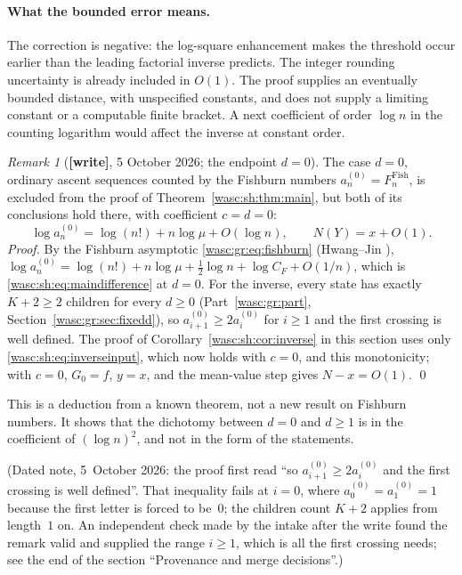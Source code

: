 \documentclass[11pt,a4paper]{article}
\theoremstyle{remark}\newtheorem{remark}[theorem]{Remark}
\numberwithin{equation}{section}
\newcommand{\wtag}{\textup{\textbf{[write]}}}
\begin{document}
\paragraph{What the bounded error means.}
The correction is negative: the log-square enhancement makes the threshold occur earlier than the leading factorial inverse predicts. The integer rounding uncertainty is already included in $O(1)$. The proof supplies an eventually bounded distance, with unspecified constants, and does not supply a limiting constant or a computable finite bracket. A next coefficient of order $\log n$ in the counting logarithm would affect the inverse at constant order.
\begin{remark}[\wtag, 5 October 2026; the endpoint $d=0$]\label{wasc:sh:rem:dzero}
The case $d=0$, ordinary ascent sequences counted by the Fishburn numbers $a^{(0)}_n=F^{\mathrm{Fish}}_n$, is excluded from the proof of Theorem~\ref{wasc:sh:thm:main}, but both of its conclusions hold there, with coefficient $c=d=0$:
\[
\log a^{(0)}_n=\log(n!)+n\log\mu+O(\log n),\qquad N(Y)=x+O(1).
\]
\emph{Proof.} By the Fishburn asymptotic \eqref{wasc:gr:eq:fishburn} (Hwang--Jin \cite{hwang}), $\log a^{(0)}_n=\log(n!)+n\log\mu+\frac12\log n+\log C_F+O(1/n)$, which is \eqref{wasc:sh:eq:maindifference} at $d=0$. For the inverse, every state has exactly $K+2\ge2$ children for every $d\ge0$ (Part~\ref{wasc:gr:part}, Section~\ref{wasc:gr:sec:fixedd}), so $a^{(0)}_{i+1}\ge2a^{(0)}_i$ for $i\ge1$ and the first crossing is well defined. The proof of Corollary~\ref{wasc:sh:cor:inverse} in this section uses only \eqref{wasc:sh:eq:inverseinput}, which now holds with $c=0$, and this monotonicity; with $c=0$, $G_0=f$, $y=x$, and the mean-value step gives $N-x=O(1)$. \qed

This is a deduction from a known theorem, not a new result on Fishburn numbers. It shows that the dichotomy between $d=0$ and $d\ge1$ is in the coefficient of $(\log n)^2$, and not in the form of the statements.

(Dated note, 5~October 2026: the proof first read ``so $a^{(0)}_{i+1}\ge2a^{(0)}_i$ and the first crossing is well defined''. That inequality fails at $i=0$, where $a^{(0)}_0=a^{(0)}_1=1$ because the first letter is forced to be~$0$; the children count $K+2$ applies from length~$1$ on. An independent check made by the intake after the write found the remark valid and supplied the range $i\ge1$, which is all the first crossing needs; see the end of the section ``Provenance and merge decisions''.)
\end{remark}
\end{document}
